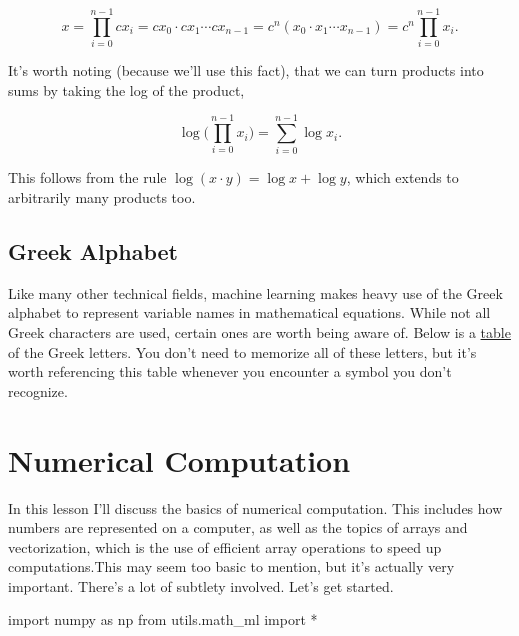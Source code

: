 \documentclass[
  letterpaper,
  DIV=11,
  numbers=noendperiod]{scrreprt}
\newenvironment{Shaded}{\begin{snugshade}}{\end{snugshade}}
\newcommand{\ImportTok}[1]{\textcolor[rgb]{0.00,0.46,0.62}{#1}}
\newcommand{\NormalTok}[1]{\textcolor[rgb]{0.00,0.23,0.31}{#1}}
\newcommand{\OperatorTok}[1]{\textcolor[rgb]{0.37,0.37,0.37}{#1}}
\begin{document}
\[x = \prod_{i=0}^{n-1} cx_i = cx_0 \cdot cx_1 \cdots cx_{n-1} = c^n(x_0 \cdot x_1 \cdots x_{n-1}) = c^n \prod_{i=0}^{n-1} x_i.\]

It's worth noting (because we'll use this fact), that we can turn
products into sums by taking the log of the product,

\[\log \bigg(\prod_{i=0}^{n-1} x_i \bigg) = \sum_{i=0}^{n-1} \log x_i.\]

This follows from the rule \(\log(x \cdot y) = \log x + \log y\), which
extends to arbitrarily many products too.

\hypertarget{greek-alphabet}{%
\section{Greek Alphabet}\label{greek-alphabet}}

Like many other technical fields, machine learning makes heavy use of
the Greek alphabet to represent variable names in mathematical
equations. While not all Greek characters are used, certain ones are
worth being aware of. Below is a
\href{https://howtosaymathematics.files.wordpress.com/2011/08/greek-alphabet2.pdf}{table}
of the Greek letters. You don't need to memorize all of these letters,
but it's worth referencing this table whenever you encounter a symbol
you don't recognize.


\hypertarget{numerical-computation}{%
\chapter{Numerical Computation}\label{numerical-computation}}

In this lesson I'll discuss the basics of numerical computation. This
includes how numbers are represented on a computer, as well as the
topics of arrays and vectorization, which is the use of efficient array
operations to speed up computations.This may seem too basic to mention,
but it's actually very important. There's a lot of subtlety involved.
Let's get started.

\begin{Shaded}
\begin{Highlighting}[]
\ImportTok{import}\NormalTok{ numpy }\ImportTok{as}\NormalTok{ np}
\ImportTok{from}\NormalTok{ utils.math\_ml }\ImportTok{import} \OperatorTok{*}
\end{Highlighting}
\end{Shaded}
\end{document}
